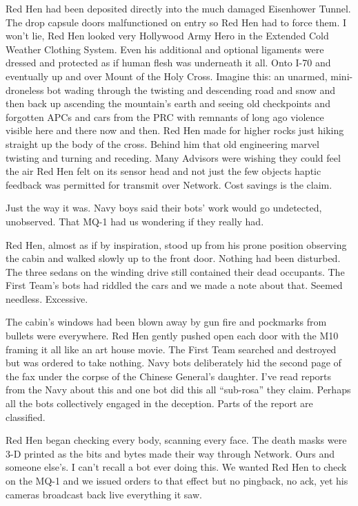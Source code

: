 \documentclass[13pt|draft]{report}
\begin{document}
Red Hen had been deposited directly into the much damaged Eisenhower Tunnel. The drop capsule doors malfunctioned on entry so Red Hen had to force them. I won't lie, Red Hen looked very Hollywood Army Hero in the Extended Cold Weather Clothing System. Even his additional and optional ligaments were dressed and protected as if human flesh was underneath it all. Onto I-70 and eventually up and over Mount of the Holy Cross. Imagine this: an unarmed, mini-droneless bot wading through the twisting and descending road and snow and then back up ascending the mountain's earth and seeing old checkpoints and forgotten APCs and cars from the PRC with remnants of long ago violence visible here and there now and then. Red Hen made for higher rocks just hiking straight up the body of the cross. Behind him that old engineering marvel twisting and turning and receding. Many Advisors were wishing they could feel the air Red Hen felt on its sensor head and not just the few objects haptic feedback was permitted for transmit over Network. Cost savings is the claim.

Just the way it was. Navy boys said their bots' work would go undetected, unobserved. That MQ-1 had us wondering if they really had.

Red Hen, almost as if by inspiration, stood up from his prone position observing the cabin and walked slowly up to the front door. Nothing had been disturbed. The three sedans on the winding drive still contained their dead occupants. The First Team's bots had riddled the cars and we made a note about that. Seemed needless. Excessive.

The cabin's windows had been blown away by gun fire and pockmarks from bullets were everywhere. Red Hen gently pushed open each door with the M10 framing it all like an art house movie. The First Team searched and destroyed but was ordered to take nothing. Navy bots deliberately hid the second page of the fax under the corpse of the Chinese General's daughter. I've read reports from the Navy about this and one bot did this all ``sub-rosa'' they claim. Perhaps all the bots collectively engaged in the deception. Parts of the report are classified.

Red Hen began checking every body, scanning every face. The death masks were 3-D printed as the bits and bytes made their way through Network. Ours and someone else's. I can't recall a bot ever doing this. We wanted Red Hen to check on the MQ-1 and we issued orders to that effect but no pingback, no ack, yet his cameras broadcast back live everything it saw.
\end{document}
